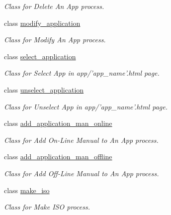\begin{CompactItemize}
\begin{CompactList}\small\item\em Class for {\em Delete\/} {\em An\/} {\em App\/} process. \item\end{CompactList}\item 
class \hyperlink{classweb__winsol_1_1modify__application}{modify\_\-application}
\begin{CompactList}\small\item\em Class for {\em Modify\/} {\em An\/} {\em App\/} process. \item\end{CompactList}\item 
class \hyperlink{classweb__winsol_1_1select__application}{select\_\-application}
\begin{CompactList}\small\item\em Class for {\em Select\/} {\em App\/} in {\em app/'app\_\-name'\/}.html page. \item\end{CompactList}\item 
class \hyperlink{classweb__winsol_1_1unselect__application}{unselect\_\-application}
\begin{CompactList}\small\item\em Class for {\em Unselect\/} {\em App\/} in {\em app/'app\_\-name'\/}.html page. \item\end{CompactList}\item 
class \hyperlink{classweb__winsol_1_1add__application__man__online}{add\_\-application\_\-man\_\-online}
\begin{CompactList}\small\item\em Class for {\em Add\/} {\em On-Line\/} {\em Manual\/} {\em to\/} {\em An\/} {\em App\/} process. \item\end{CompactList}\item 
class \hyperlink{classweb__winsol_1_1add__application__man__offline}{add\_\-application\_\-man\_\-offline}
\begin{CompactList}\small\item\em Class for {\em Add\/} {\em Off-Line\/} {\em Manual\/} {\em to\/} {\em An\/} {\em App\/} process. \item\end{CompactList}\item 
class \hyperlink{classweb__winsol_1_1make__iso}{make\_\-iso}
\begin{CompactList}\small\item\em Class for {\em Make\/} {\em ISO\/} process. \item\end{CompactList}\item 

\end{CompactItemize}
